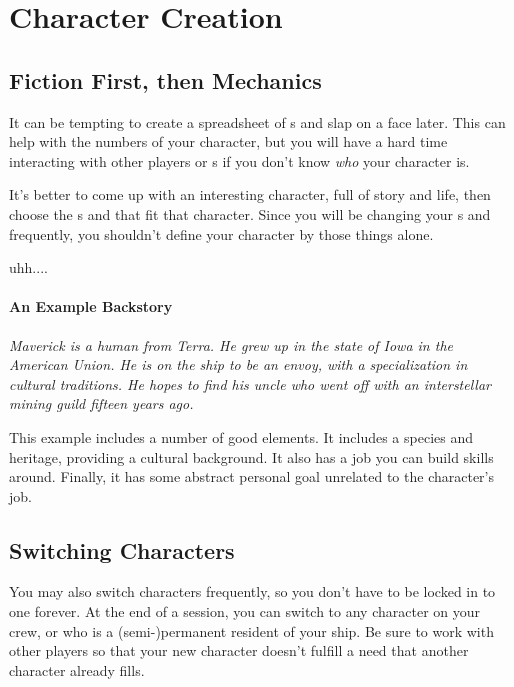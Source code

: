 \section{Character Creation}

\subsection{Fiction First, then Mechanics}

\par
It can be tempting to create a spreadsheet of \skill s and slap on a face later. This can help with the numbers of your character, but you will have a hard time interacting with other players or \npc s if you don't know \textit{who} your character is.

\par
It's better to come up with an interesting character, full of story and life, then choose the \skill s and \abilityP that fit that character. Since you will be changing your \skill s and \abilityP frequently, you shouldn't define your character by those things alone.

\par
uhh....

\paragraph{An Example Backstory}
\textit{Maverick is a human from Terra. He grew up in the state of Iowa in the American Union. He is on the ship to be an envoy, with a specialization in cultural traditions. He hopes to find his uncle who went off with an interstellar mining guild fifteen years ago.}

\par
This example includes a number of good elements. It includes a species and heritage, providing a cultural background. It also has a job you can build skills around. Finally, it has some abstract personal goal unrelated to the character's job.

\subsection{Switching Characters}

\par
You may also switch characters frequently, so you don't have to be locked in to one forever. At the end of a session, you can switch to any character on your crew, or who is a (semi-)permanent resident of your ship. Be sure to work with other players so that your new character doesn't fulfill a need that another character already fills.

